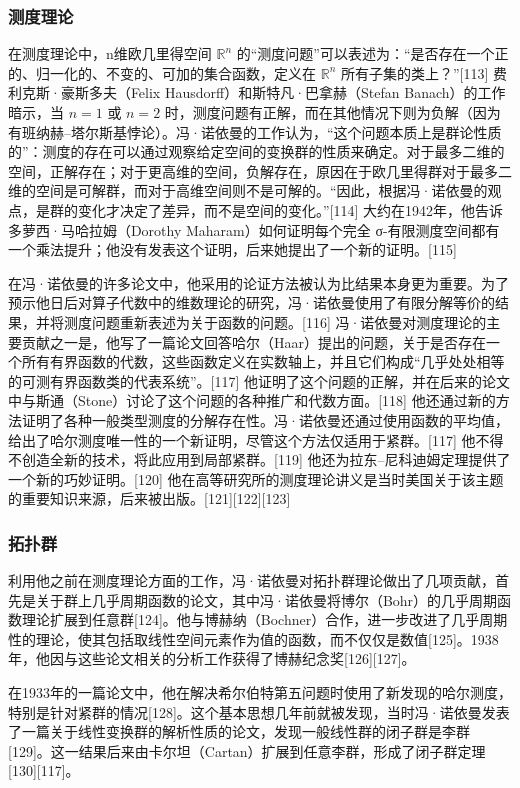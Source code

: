 \subsubsection{测度理论}  
在测度理论中，n维欧几里得空间 \( \mathbb{R}^n \) 的“测度问题”可以表述为：“是否存在一个正的、归一化的、不变的、可加的集合函数，定义在 \( \mathbb{R}^n \) 所有子集的类上？”[113] 费利克斯·豪斯多夫（Felix Hausdorff）和斯特凡·巴拿赫（Stefan Banach）的工作暗示，当 \( n = 1 \) 或 \( n = 2 \) 时，测度问题有正解，而在其他情况下则为负解（因为有班纳赫–塔尔斯基悖论）。冯·诺依曼的工作认为，“这个问题本质上是群论性质的”：测度的存在可以通过观察给定空间的变换群的性质来确定。对于最多二维的空间，正解存在；对于更高维的空间，负解存在，原因在于欧几里得群对于最多二维的空间是可解群，而对于高维空间则不是可解的。“因此，根据冯·诺依曼的观点，是群的变化才决定了差异，而不是空间的变化。”[114] 大约在1942年，他告诉多萝西·马哈拉姆（Dorothy Maharam）如何证明每个完全 σ-有限测度空间都有一个乘法提升；他没有发表这个证明，后来她提出了一个新的证明。[115]

在冯·诺依曼的许多论文中，他采用的论证方法被认为比结果本身更为重要。为了预示他日后对算子代数中的维数理论的研究，冯·诺依曼使用了有限分解等价的结果，并将测度问题重新表述为关于函数的问题。[116] 冯·诺依曼对测度理论的主要贡献之一是，他写了一篇论文回答哈尔（Haar）提出的问题，关于是否存在一个所有有界函数的代数，这些函数定义在实数轴上，并且它们构成“几乎处处相等的可测有界函数类的代表系统”。[117] 他证明了这个问题的正解，并在后来的论文中与斯通（Stone）讨论了这个问题的各种推广和代数方面。[118] 他还通过新的方法证明了各种一般类型测度的分解存在性。冯·诺依曼还通过使用函数的平均值，给出了哈尔测度唯一性的一个新证明，尽管这个方法仅适用于紧群。[117] 他不得不创造全新的技术，将此应用到局部紧群。[119] 他还为拉东–尼科迪姆定理提供了一个新的巧妙证明。[120] 他在高等研究所的测度理论讲义是当时美国关于该主题的重要知识来源，后来被出版。[121][122][123]
\subsubsection{拓扑群}
利用他之前在测度理论方面的工作，冯·诺依曼对拓扑群理论做出了几项贡献，首先是关于群上几乎周期函数的论文，其中冯·诺依曼将博尔（Bohr）的几乎周期函数理论扩展到任意群[124]。他与博赫纳（Bochner）合作，进一步改进了几乎周期性的理论，使其包括取线性空间元素作为值的函数，而不仅仅是数值[125]。1938年，他因与这些论文相关的分析工作获得了博赫纪念奖[126][127]。

在1933年的一篇论文中，他在解决希尔伯特第五问题时使用了新发现的哈尔测度，特别是针对紧群的情况[128]。这个基本思想几年前就被发现，当时冯·诺依曼发表了一篇关于线性变换群的解析性质的论文，发现一般线性群的闭子群是李群[129]。这一结果后来由卡尔坦（Cartan）扩展到任意李群，形成了闭子群定理[130][117]。
